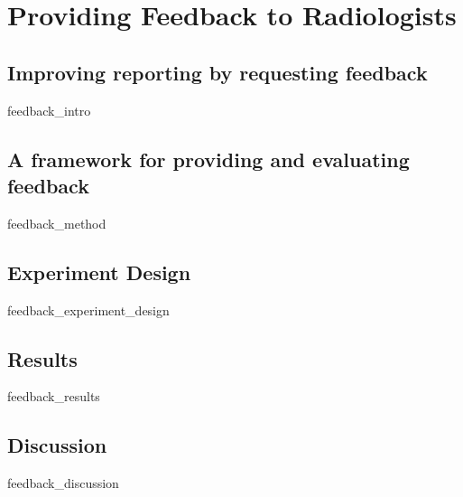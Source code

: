 \chapter{Providing Feedback to Radiologists}

\section{Improving reporting by requesting feedback}
{feedback_intro}
\clearpage

\section{A framework for providing and evaluating feedback}
{feedback_method}
\clearpage

\section{Experiment Design}
{feedback_experiment_design}
\clearpage

\section{Results}
{feedback_results}
\clearpage

\section{Discussion}
{feedback_discussion}